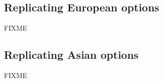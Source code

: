 \documentclass[reqno]{amsart}
\begin{document}
\subsection{Replicating European options}
FIXME
\subsection{Replicating Asian options}
FIXME


\end{document}
